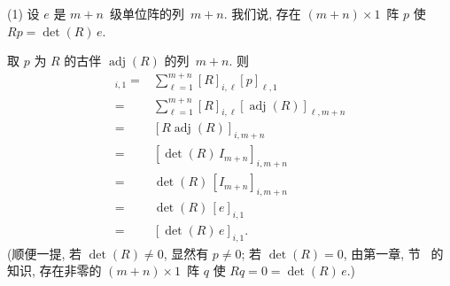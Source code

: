 \begin{example}
    (1)
    设 \(e\) 是 \(m + n\)~级单位阵的列~\(m + n\).
    我们说, 存在
    \((m + n) \times 1\)~阵 \(p\) 使
    \(Rp = \det {(R)}\, e\).

    取 \(p\) 为 \(R\) 的古伴
    \(\operatorname{adj} {(R)}\) 的列~\(m + n\).
    则
    \begin{align*}
        [Rp]_{i,1}
        = {} &
        \sum_{\ell = 1}^{m + n}
        {[R]_{i,\ell} [p]_{\ell,1}}
        \\
        = {} &
        \sum_{\ell = 1}^{m + n}
        {[R]_{i,\ell} [\operatorname{adj} {(R)}]_{\ell,m+n}}
        \\
        = {} &
        [R \operatorname{adj} {(R)}]_{i,m+n}
        \\
        = {} &
        [\det {(R)}\, I_{m+n}]_{i,m+n}
        \\
        = {} &
        \det {(R)}\, [I_{m+n}]_{i,m+n}
        \\
        = {} &
        \det {(R)}\, [e]_{i,1}
        \\
        = {} &
        [\det {(R)}\, e]_{i,1}.
    \end{align*}
    (顺便一提, 若 \(\det {(R)} \neq 0\), 显然有 \(p \neq 0\);
    若 \(\det {(R)} = 0\),
    由第一章, 节~ 的知识,
    存在非零的 \((m + n) \times 1\)~阵 \(q\)
    使 \(Rq = 0 = \det {(R)}\, e\).)


\end{example}
